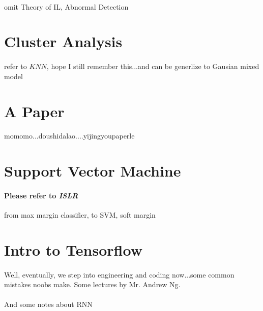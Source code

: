 \documentclass{article}
\begin{document}
  \paragraph{} omit Theory of IL, Abnormal Detection

\section{Cluster Analysis}
  \paragraph{} refer to $KNN$, hope I still remember this...and can be generlize to Gausian mixed model

\section{A Paper}
  \paragraph{} momomo...doushidalao....yijingyoupaperle

\section{Support Vector Machine}
  \paragraph{Please refer to \textit{ISLR}} from max margin classifier, to SVM, soft margin

\section{Intro to Tensorflow}
  \paragraph{} Well, eventually, we step into engineering and coding now...some common mistakes noobs make. Some lectures by Mr. Andrew Ng.
  \paragraph{} And some notes about RNN
\end{document}
